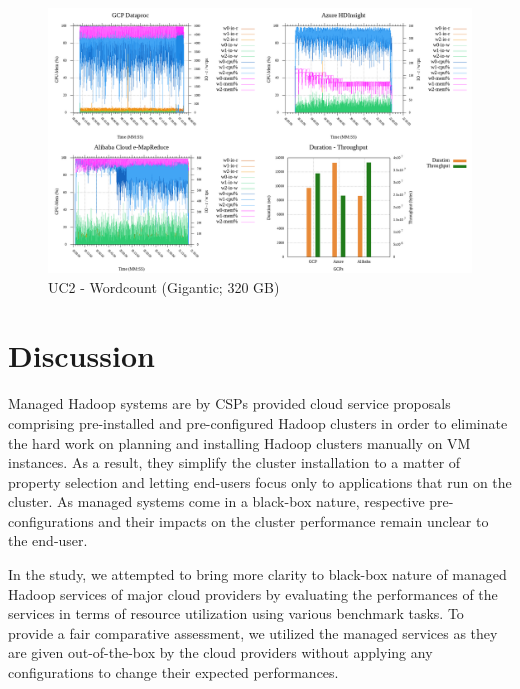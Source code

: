 \documentclass[review]{elsarticle}
\begin{document}
	\begin{figure}[p]
		\caption{UC2 - Wordcount (Gigantic; 320 GB)}
		\label{fig:uc2-wrdcnt-g-cmidt}
		\includegraphics[width=\textwidth]{uc2-wrdcnt-g-cmidt}
		\centering
	\end{figure}
	
	\section{Discussion}
	Managed Hadoop systems are by CSPs provided cloud service proposals comprising pre-installed and pre-configured Hadoop clusters in order to eliminate the hard work on planning and installing Hadoop clusters manually on VM instances. As a result, they simplify the cluster installation to a matter of property selection and letting end-users focus only to applications that run on the cluster. As managed systems come in a black-box nature, respective pre-configurations and their impacts on the cluster performance remain unclear to the end-user. 
	
	In the study, we attempted to bring more clarity to black-box nature of managed Hadoop services of major cloud providers by evaluating the performances of the services in terms of resource utilization using various benchmark tasks. To provide a fair comparative assessment, we utilized the managed services as they are given out-of-the-box by the cloud providers without applying any configurations to change their expected performances. 
	
\end{document}
